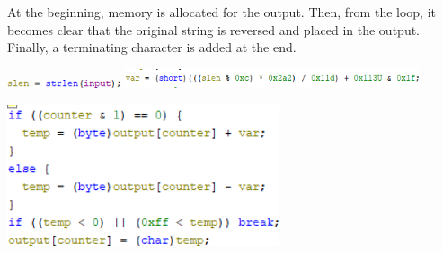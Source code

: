 \documentclass{article}
\begin{document}
At the beginning, memory is allocated for the output. Then, from the loop, it becomes clear that the original string is reversed and placed in the output. Finally, a terminating character is added at the end.
\vspace{3mm}
\begin{paracol}{2}
    \includegraphics[width=0.25\textwidth]{"image75.png"}
    \switchcolumn
    \includegraphics[width=0.65\textwidth]{"image76.png"}
\end{paracol}
\includegraphics[width=0.6\textwidth]{"image77.png"}
\end{document}
